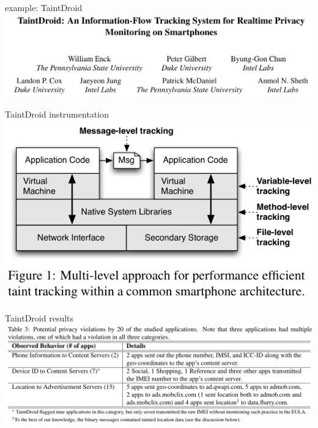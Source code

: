 \begin{frame}{example: TaintDroid}
\includegraphics[width=\textwidth]{../taint/taintdroid}
\end{frame}

\begin{frame}{TaintDroid instrumentation}
\includegraphics[height=0.9\textheight]{../taint/taintdroid-fig1}
\end{frame}

\begin{frame}{TaintDroid results}
\includegraphics[width=\textwidth]{../taint/taintdroid-tbl3}
\end{frame}

